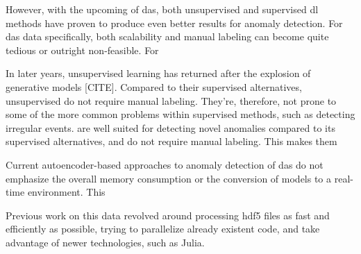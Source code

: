 However, with the upcoming of \acrshort{das}, both unsupervised and supervised \acrfull{dl} methods have proven to produce even better results for anomaly detection. For \acrshort{das} data specifically, both scalability and manual labeling can become quite tedious or outright non-feasible. For 

In later years, unsupervised learning has returned after the explosion of generative models [CITE]. Compared to their supervised alternatives, unsupervised do not require manual labeling. They're, therefore, not prone to some of the more common problems within supervised methods, such as detecting irregular events.   are well suited for detecting novel anomalies \cite{wei2022lstmautoencoder, srivastava2016unsupervised} compared to its supervised alternatives, and do not require manual labeling. This makes them 

Current autoencoder-based approaches to anomaly detection of \acrshort{das} do not emphasize the overall memory consumption or the conversion of models to a real-time environment. This 



Previous work on this data \cite{projthesis} revolved around processing \acrshort{hdf5} files as fast and efficiently as possible, trying to parallelize already existent code, and take advantage of newer technologies, such as Julia.
